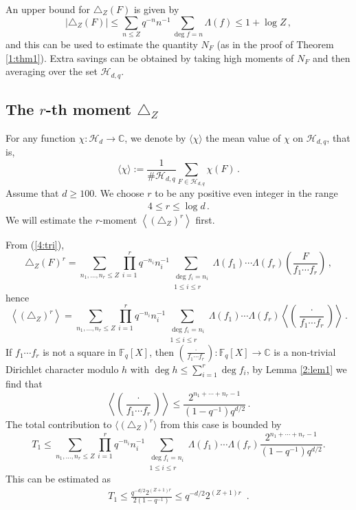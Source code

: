 \documentclass[12pt]{amsart}
\theoremstyle{plain}
\newcommand{\CC}{{\mathbb C}}
\newcommand{\F}{{\mathbb F}_q}
\newcommand{\HH}{{\mathcal H}}
\begin{document}
An upper bound for $\triangle_Z(F)$ is given by
\[\left|\triangle_Z(F)\right| \le \sum_{n \le Z}q^{-n}n^{-1} \sum_{\deg f=n} \Lambda(f)\le 1+\log Z\,,\]
and this can be used to estimate the quantity $N_F$ (as in the proof of Theorem \ref{1:thm1}). Extra savings can be obtained by taking high moments of $N_F$ and then averaging over the set $\HH_{d,q}$.

\subsection{The $r$-th moment $\triangle_Z$}

For any function $\chi: \HH_d \to \CC$, we denote by $\langle \chi \rangle$ the mean value of $\chi$ on $\HH_{d,q}$, that is,
\[\langle \chi \rangle:=\frac{1}{\# \HH_{d,q}} \sum_{F \in \HH_{d,q}} \chi(F)\,. \]
Assume that $d \ge 100$. We choose $r$ to be any positive even integer in the range
\begin{eqnarray} \label{4:r} 4 \le r \le \log d \,.\end{eqnarray}
We will estimate the $r$-moment $\left\langle (\triangle_Z)^r\right\rangle$ first.

From (\ref{4:tri}),
\[\triangle_Z(F)^r=\sum_{n_1,\ldots,n_r \le Z} \prod_{i=1}^r q^{-n_i}n_i^{-1} \sum_{\substack{\deg f_i=n_i\\ 1 \le i \le r}} \Lambda(f_1) \cdots \Lambda(f_r) \left(\frac{F}{f_1 \cdots f_r}\right)\,,\]
hence
\[\left\langle(\triangle_Z)^r \right\rangle=\sum_{n_1,\ldots,n_r \le Z} \prod_{i=1}^r q^{-n_i}n_i^{-1} \sum_{\substack{\deg f_i=n_i\\ 1 \le i \le r}} \Lambda(f_1) \cdots \Lambda(f_r) \left\langle\left(\frac{\cdot}{f_1 \cdots f_r}\right)\right \rangle \,.\]
If $f_1 \cdots f_r$ is not a square in $\F[X]$, then $\left(\frac{\cdot}{f_1 \cdots f_r}\right):\F[X] \to \CC$ is a non-trivial Dirichlet character modulo $h$ with $\deg h \le \sum_{i=1}^r \deg f_i$, by Lemma \ref{2:lem1} we find that
\[ \left\langle\left(\frac{\cdot}{f_1 \cdots f_r}\right)\right \rangle \le \frac{2^{n_1+\cdots+n_r-1}}{\left(1-q^{-1}\right)q^{d/2}}\,.\]
The total contribution to $\langle(\triangle_Z)^r \rangle$ from this case is bounded by
\[T_1 \le \sum_{n_1, \ldots, n_r \le Z} \prod_{i=1}^r q^{-n_i}n_i^{-1} \sum_{\substack{\deg f_i =n_i \\ 1 \le i \le r}} \Lambda(f_1) \cdots \Lambda(f_r) \frac{2^{n_1+\cdots+n_r-1}}{\left(1-q^{-1}\right)q^{d/2}}.\]
This can be estimated as
\begin{eqnarray} \label{4:t1} T_1 \le \frac{q^{-d/2} 2^{(Z+1)r}}{2\left(1-q^{-1}\right)} \le q^{-d/2} 2^{(Z+1)r}\,\, \,.\end{eqnarray}
\end{document}
